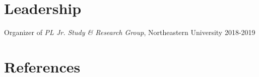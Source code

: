 \documentclass[margin,line]{resume}
\begin{document}
\begin{resume}
   
    \section{\mysidestyle Leadership} 
    Organizer of \emph{PL Jr. Study \& Research Group}, Northeastern University \hfill 2018-2019



    \section{\mysidestyle References} 
    

    \newpage




\end{resume}
\end{document}
